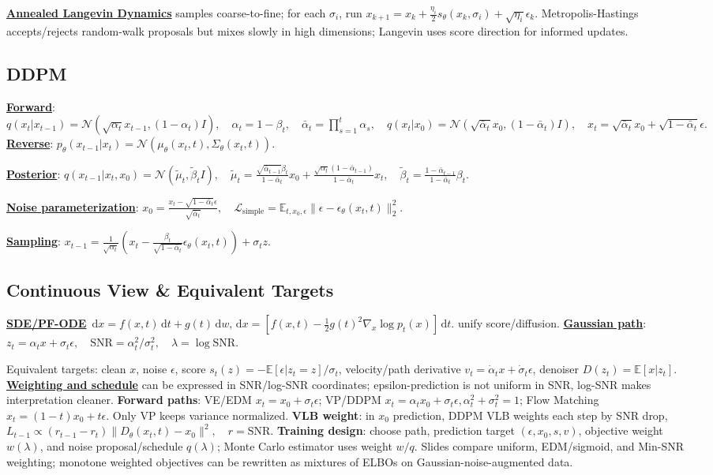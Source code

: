 \documentclass{article}
\numberwithin{equation}{subsection}
\newcommand{\key}[1]{\textbf{#1}}
\newcommand{\lowterm}[1]{\textbf{\underline{#1}}}
\newcommand{\E}{\mathbb{E}}
\newcommand{\N}{\mathcal{N}}
\newcommand{\dd}{\,\mathrm{d}}
\begin{document}
\begin{multicols*}{3}
\lowterm{Annealed Langevin Dynamics} samples coarse-to-fine; for each $\sigma_i$, run
\(
x_{k+1}=x_k+\frac{\eta_i}{2}s_\theta(x_k,\sigma_i)+\sqrt{\eta_i}\epsilon_k .
\)
Metropolis-Hastings accepts/rejects random-walk proposals but mixes slowly in high dimensions; Langevin uses score direction for informed updates.

\subsection{DDPM}
\lowterm{Forward}:
\(
q(x_t|x_{t-1})=\N(\sqrt{\alpha_t}x_{t-1},(1-\alpha_t)I),\quad \alpha_t=1-\beta_t,\quad
\bar\alpha_t=\prod_{s=1}^t\alpha_s,\quad
q(x_t|x_0)=\N(\sqrt{\bar\alpha_t}x_0,(1-\bar\alpha_t)I),\quad
x_t=\sqrt{\bar\alpha_t}x_0+\sqrt{1-\bar\alpha_t}\epsilon.
\)
\lowterm{Reverse}:
\(
p_\theta(x_{t-1}|x_t)=\N(\mu_\theta(x_t,t),\Sigma_\theta(x_t,t)).
\)

\lowterm{Posterior}:
\(
q(x_{t-1}|x_t,x_0)=\N(\tilde\mu_t,\tilde\beta_tI),\quad
\tilde\mu_t=\frac{\sqrt{\bar\alpha_{t-1}}\beta_t}{1-\bar\alpha_t}x_0+
\frac{\sqrt{\alpha_t}(1-\bar\alpha_{t-1})}{1-\bar\alpha_t}x_t,\quad
\tilde\beta_t=\frac{1-\bar\alpha_{t-1}}{1-\bar\alpha_t}\beta_t.
\)


\lowterm{Noise parameterization}:
\(
x_0=\frac{x_t-\sqrt{1-\bar\alpha_t}\epsilon}{\sqrt{\bar\alpha_t}},
\quad
\mathcal L_{\mathrm{simple}}=\E_{t,x_0,\epsilon}\|\epsilon-\epsilon_\theta(x_t,t)\|_2^2.
\)

\lowterm{Sampling}:
\(
x_{t-1}=\frac{1}{\sqrt{\alpha_t}}\left(x_t-\frac{\beta_t}{\sqrt{1-\bar\alpha_t}}\epsilon_\theta(x_t,t)\right)+\sigma_tz.
\)

\subsection{Continuous View \& Equivalent Targets}
\lowterm{SDE/PF-ODE} 
\(
\dd x=f(x,t)\dd t+g(t)\dd w,
\dd x=\left[f(x,t)-\frac12g(t)^2\nabla_x\log p_t(x)\right]\dd t.
\) unify score/diffusion.
\lowterm{Gaussian path}:
\(
z_t=\alpha_t x+\sigma_t\epsilon,\quad \mathrm{SNR}=\alpha_t^2/\sigma_t^2,\quad \lambda=\log \mathrm{SNR}.
\)

Equivalent targets: clean $x$, noise $\epsilon$, score $s_t(z)=-\E[\epsilon|z_t=z]/\sigma_t$, velocity/path derivative $v_t=\dot\alpha_tx+\dot\sigma_t\epsilon$, denoiser $D(z_t)=\E[x|z_t]$. \lowterm{Weighting and schedule} can be expressed in SNR/log-SNR coordinates; epsilon-prediction is not uniform in SNR, log-SNR makes interpretation cleaner.
\key{Forward paths}: VE/EDM $x_t=x_0+\sigma_t\epsilon$; VP/DDPM $x_t=\alpha_tx_0+\sigma_t\epsilon,\alpha_t^2+\sigma_t^2=1$; Flow Matching $x_t=(1-t)x_0+t\epsilon$. Only VP keeps variance normalized. \key{VLB weight}: in $x_0$ prediction, DDPM VLB weights each step by SNR drop,
\(
L_{t-1}\propto (r_{t-1}-r_t)\|D_\theta(x_t,t)-x_0\|^2,\quad r=\mathrm{SNR}.
\)
\key{Training design}: choose path, prediction target $(\epsilon,x_0,s,v)$, objective weight $w(\lambda)$, and noise proposal/schedule $q(\lambda)$; Monte Carlo estimator uses weight $w/q$. Slides compare uniform, EDM/sigmoid, and Min-SNR weighting; monotone weighted objectives can be rewritten as mixtures of ELBOs on Gaussian-noise-augmented data.


\end{multicols*}
\end{document}
